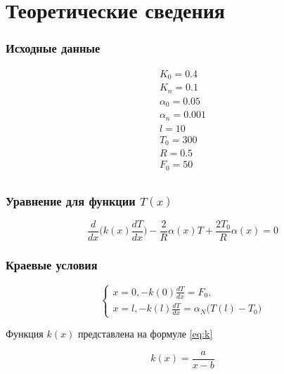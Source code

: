 \chapter{Теоретические сведения}

\subsection{Исходные данные}

\begin{equation*}
    \begin{matrix}
        K_0 = 0.4 \\
        K_n = 0.1 \\
        \alpha_0 = 0.05 \\
        \alpha_n = 0.001 \\
        l = 10 \\
        T_0 = 300 \\
        R = 0.5 \\
        F_0 = 50 \\
    \end{matrix}
\end{equation*}

\subsection{Уравнение для функции $T(x)$}

\begin{equation}\label{eq:t(x)}
    \frac{d}{dx} \bigg( k(x) \frac{dT}{dx} \bigg) - \frac{2}{R} \alpha(x)T +
    \frac{2T_0}{R} \alpha(x) = 0
\end{equation}

\subsection{Краевые условия}

\begin{equation*}
    \begin{cases}
        x = 0, -k(0) \frac{dT}{dx} = F_0, \\
        x = l, -k(l) \frac{dT}{dx} = \alpha_N \big( T(l) - T_0 \big)
    \end{cases}
\end{equation*}

Функция $k(x)$ представлена на формуле \ref{eq:k}

\begin{equation}\label{eq:k}
    k(x) = \frac{a}{x - b}
\end{equation}

